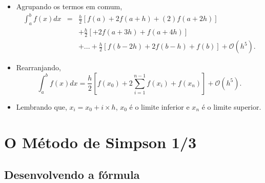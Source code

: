 \documentclass[xcolor=table]{beamer}
\newenvironment{stepitemize}{\begin{itemize}[<+->]}{\end{itemize} }
\begin{document}
\begin{frame}%

\begin{stepitemize}
\item Agrupando os termos em comum,%
\begin{eqnarray*}
\int_{a}^{b}f\left( x\right) dx &=&\frac{h}{2}\left[ f\left( a\right)
+2f\left( a+h\right) +\left( 2\right) f\left( a+2h\right) \right]  \\
&&+\frac{h}{2}\left[ +2f\left( a+3h\right) +f\left( a+4h\right) \right]  \\
&&+...+\frac{h}{2}\left[ f\left( b-2h\right) +2f\left( b-h\right) +f\left(
b\right) \right] +\mathcal{O}\left( h^{5}\right) .
\end{eqnarray*}

\item Rearranjando,%
\[
\int_{a}^{b}f\left( x\right) dx=\frac{h}{2}\left[ f\left( x_{0}\right)
+2\sum_{i=1}^{n-1}f\left( x_{i}\right) +f\left( x_{n}\right) \right] + \mathcal{O}\left( h^{5} \right) .
\]

\item Lembrando que, $x_{i}=x_{0}+i\times h$, $x_{0}$ \'{e} o limite
inferior e $x_{n}$ \'{e} o limite superior.
\end{stepitemize}

\transboxout%
\end{frame}%

\section{O M\'{e}todo de Simpson 1/3}

\subsection{Desenvolvendo a f\'{o}rmula}
\end{document}
